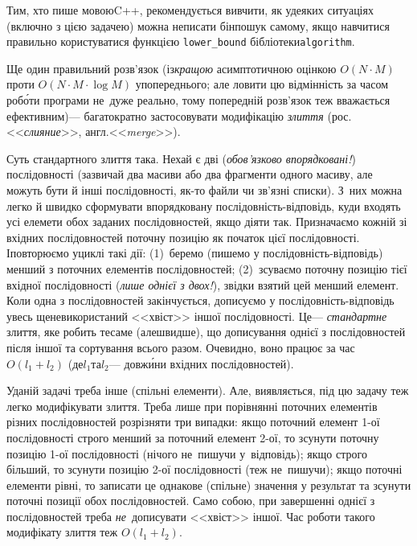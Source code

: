 Тим, хто пише мовою\nolinebreak[3] C++, рекомендується вивчити, як у\nolinebreak[3] деяких ситуаціях (включно з цією задачею) можна не\nolinebreak[3] писати бін\-пошук самому, якщо навчитися правильно користуватися функцією \verb"lower_bound" бібліотеки\nolinebreak[2] \texttt{algorithm}.


Ще один правильний розв'язок (із\nolinebreak[2] \emph{кращою} асимптотичною оцінкою $O(N{\cdot}M)$ проти $O(N{\cdot}M{\cdot}\log{}M)$ у\nolinebreak[3] попереднього; але ловити цю відмінність за часом роб\'{о}ти програми не~дуже реально, тому попередній розв'язок теж вважається ефективним)\nolinebreak[3] --- багатократно застосовувати модифікацію \emph{злиття} (рос.\nolinebreak[3] <<\emph{слияние}>>, англ.\nolinebreak[3] <<\emph{merge}>>). 

Суть стандартного злиття така. Нехай є дві (\emph{обов'язково впорядковані!}) послідовності (зазвичай два масиви або два фрагменти одного масиву, але можуть бути й інші послідовності, як-то файли чи зв'язні списки). З~них можна легко й швидко сформувати впорядковану послі\-дов\-ність-від\-повідь, куди входять усі елемети обох заданих послідовностей, якщо діяти так. Призначаємо кожній зі вхідних послідовностей поточну позицію як початок цієї послідовності. І\nolinebreak[3] повторюємо у\nolinebreak[3] циклі такі дії: (1)~беремо (пишемо у послі\-дов\-ність-від\-по\-відь) менший з поточних елементів послідовностей; (2)~зсуваємо поточну позицію тієї вхідної послідовності (\emph{лише однієї з двох!}), звідки взятий цей менший елемент. Коли одна з послідовностей закінчується, дописуємо у послі\-дов\-ність-від\-по\-відь увесь ще\nolinebreak[3] не\nolinebreak[3] використаний <<хвіст>> іншої послідовності. Це\nolinebreak[3] --- \emph{стандартне} злиття, яке робить те\nolinebreak[3] саме (але\nolinebreak[3] швидше), що дописування однієї з послідовностей після іншої та сортування всього разом. Очевидно, воно працює за час $O(l_1{+}l_2)$ (де\nolinebreak[3] $l_1$\nolinebreak[1] та\nolinebreak[3] $l_2$\nolinebreak[3] --- довж\'{и}ни вхідних послідовностей).

У\nolinebreak[3] даній задачі треба інше (спільні елементи). Але, виявляється, під цю задачу теж легко модифікувати злиття. Треба лише при порівнянні поточних елементів різних послідовностей розрізняти три випадки: якщо поточний елемент \mbox{1-ої} послідовності строго менший за поточний елемент \mbox{2-ої}, то зсунути поточну позицію \mbox{1-ої} послідовності (нічого не~пишучи у~відповідь); якщо строго більший, то зсунути позицію \mbox{2-ої} послідовності (теж не~пишучи); якщо поточні елементи рівні, то записати це однакове (спільне) значення у результат та зсунути поточні позиції обох послідовностей. Само собою, при завершенні однієї з послідовностей треба \emph{не}~дописувати <<хвіст>> іншої. Час роботи такого модифікату злиття теж $O(l_1{+}l_2)$.

